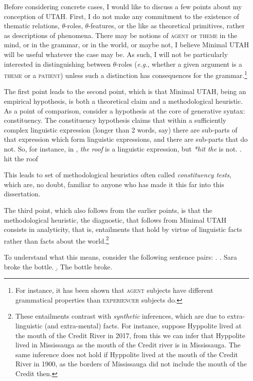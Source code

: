 \documentclass[MilwayThesis]{subfiles}
\begin{document}
Before considering concrete cases, I would like to discuss a few points about my conception of UTAH.
First, I do not make any commitment to the existence of thematic relations, $\theta$-roles, $\theta$-features, or the like as theoretical primitives, rather as descriptions of phenomena.
There may be notions of \textsc{agent} or \textsc{theme} in the mind, or in the grammar, or in the world, or maybe not, I believe Minimal UTAH will be useful whatever the case may be.
As such, I will not be particularly interested in distinguishing between $\theta$-roles (\textit{e.g.}, whether a given argument is a \textsc{theme} or a \textsc{patient}) unless such a distinction has consequences for the grammar.\footnote{
	For instance, it has been shown that \textsc{agent} subjects have different grammatical properties than \textsc{experiencer} subjects do.
}

The first point leads to the second point, which is that Minimal UTAH, being an empirical hypothesis, is both a theoretical claim and a methodological heuristic.
As a point of comparison, consider a hypothesis at the core of generative syntax: constituency.
The constituency hypothesis claims that within a sufficiently complex linguistic expression (longer than 2 words, say) there are sub-parts of that expression which form linguistic expressions, and there are sub-parts that do not.
So, for instance, in \Next, \textit{the roof} is a linguistic expression, but \textit{*hit the} is not.
\ex. hit the roof

This leads to set of methodological heuristics often called \textit{constituency tests}, which are, no doubt, familiar to anyone who has made it this far into this dissertation.

The third point, which also follows from the earlier points, is that the methodological heuristic, the diagnostic, that follows from Minimal UTAH consists in analyticity, that is, entailments that hold by virtue of linguistic facts rather than facts about the world.\footnote{
These entailments contrast with \textit{synthetic} inferences, which are due to extra-linguistic (and extra-mental) facts.
For instance, suppose Hyppolite lived at the mouth of the Credit River in 2017, from this we can infer that Hyppolite lived in Mississauga as the mouth of the Credit river is in Mississauga.
The same inference does not hold if Hyppolite lived at the mouth of the Credit River in 1900, as the borders of Mississauga did not include the mouth of the Credit then.}

To understand what this means, consider the following sentence pairs:
\ex. \label{ex:broke-bottle}
\a. Sara broke the bottle.
\b. The bottle broke.
\end{document}
